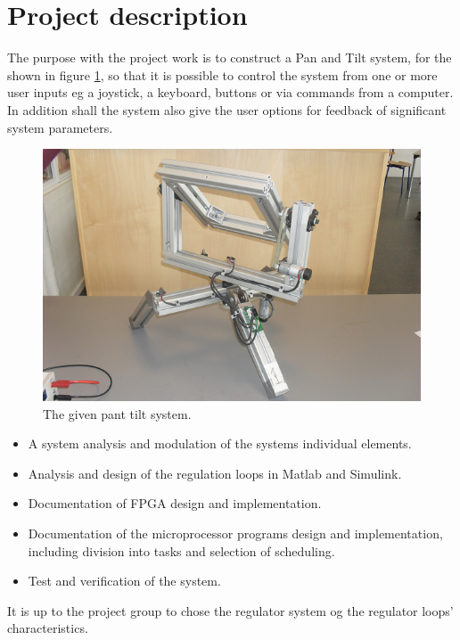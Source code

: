 
\section{Project description}
The purpose with the project work is to construct a Pan and Tilt system, for the  shown in figure \ref{fig:pantilysystem}, so that it is possible to control the system from one or more user inputs eg a joystick, a keyboard, buttons or via commands from a computer. In addition shall the system also give the user options for feedback of significant system parameters.

\begin{figure}[htb]
	\centering
	\includegraphics[width=\textwidth]{graphics/pantiltsystem.png} %
	\caption{The given pant tilt system.}
	\label{fig:pantilysystem}
\end{figure}

\begin{itemize}
\item A system analysis and modulation of the systems individual elements.
\item Analysis and design of the regulation loops in Matlab and Simulink.
\item Documentation of FPGA design and implementation.
\item Documentation of the microprocessor programs design and implementation, including division into tasks and selection of scheduling.
\item Test and verification of the system.
\end{itemize}

It is up to the project group to chose the regulator system og the regulator loops' characteristics.

